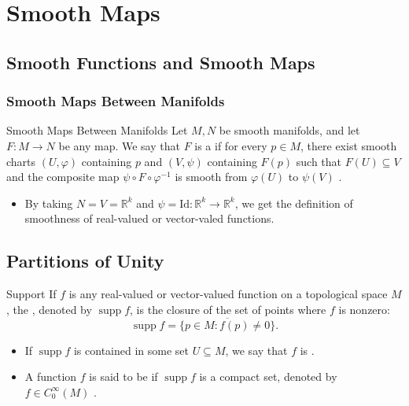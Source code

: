 \documentclass[../main.tex]{subfiles}
\begin{document}
\ifSubfilesClassLoaded{

    \tableofcontents
    
}{}

\chapter{ Smooth Maps }

\section{Smooth Functions and Smooth Maps}

\subsection{Smooth Maps Between Manifolds}

\begin{definition}{Smooth Maps Between Manifolds}{}
    Let $M, N$ be smooth manifolds, and let $F: M \to N$ be any map. We say that $F$ is a  if for every $p \in M$, there exist smooth charts $(U, \varphi)$ containing $p$ and $(V, \psi)$ containing $F(p)$ such that $F(U) \subseteq V$ and the composite map $\psi \circ F \circ \varphi^{-1}$ is smooth from $\varphi(U)$ to $\psi(V)$ .
\end{definition}

\begin{remark}
    \begin{itemize}
        \item By taking \(  N= V= \mathbb{R} ^{k}  \) and \(  \psi =\mathrm{Id}:\mathbb{R} ^{k}\to \mathbb{R} ^{k}  \), we get the definition of smoothness of real-valued or vector-valed functions.  
    \end{itemize}
    
\end{remark}

\section{Partitions of Unity}
\begin{definition}{Support}{}
    If $f$ is any real-valued or vector-valued function on a topological space $M$, the , denoted by $\operatorname{supp} f$, is the closure of the set of points where $f$ is nonzero:
\[
\operatorname{supp} f = \overline{\{p \in M : f(p) \neq 0\}}.
\]\begin{itemize}
    \item If $\operatorname{supp} f$ is contained in some set $U \subseteq M$, we say that $f$ is . 
    \item 
A function $f$ is said to be  if $\operatorname{supp} f$ is a compact set, denoted by \(  f \in C_{0}^{\infty}\left( M \right)   \) . 
\end{itemize}
\end{definition}
\end{document}
